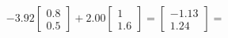 \documentclass[preview]{standalone}
\begin{document}
\begin{align*}
-3.92 \begin{bmatrix} 0.8 \\ 0.5 \end{bmatrix} + 2.00 \begin{bmatrix} 1 \\ 1.6 \end{bmatrix} = \begin{bmatrix} -1.13 \\ 1.24 \end{bmatrix} =
\end{align*}
\end{document}
